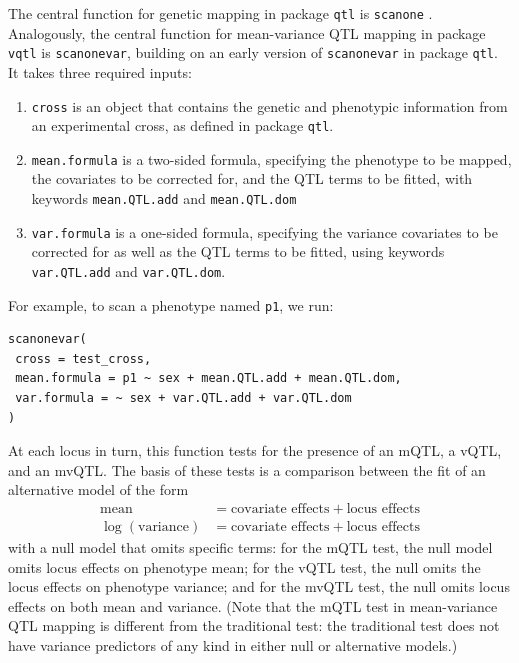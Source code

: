 \documentclass[9pt,twocolumn,twoside]{gsag3jnl}
\begin{document}
The central function for genetic mapping in package \texttt{qtl} is \texttt{scanone} \citep{Broman2003}.
Analogously, the central function for mean-variance QTL mapping in package \texttt{vqtl} is \texttt{scanonevar}, building on an early version of \texttt{scanonevar} in package \texttt{qtl}.
It takes three required inputs:
\begin{enumerate}
    \item \texttt{cross} is an object that contains the genetic and phenotypic information from an experimental cross, as defined in package \texttt{qtl}.
    \item \texttt{mean.formula} is a two-sided formula, specifying the phenotype to be mapped, the covariates to be corrected for, and the QTL terms to be fitted, with keywords \texttt{mean.QTL.add} and \texttt{mean.QTL.dom}
    \item \texttt{var.formula} is a one-sided formula, specifying the variance covariates to be corrected for as well as the QTL terms to be fitted, using keywords \texttt{var.QTL.add} and \texttt{var.QTL.dom}.
\end{enumerate}
For example, to scan a phenotype named \texttt{p1}, we run:
\begin{verbatim}
scanonevar(
 cross = test_cross,
 mean.formula = p1 ~ sex + mean.QTL.add + mean.QTL.dom,
 var.formula = ~ sex + var.QTL.add + var.QTL.dom
)
\end{verbatim}
At each locus in turn, this function tests for the presence of an mQTL, a vQTL, and an mvQTL. The basis of these tests is a comparison between the fit of an alternative model of the form
\begin{align*}
    \text{mean} &= \text{covariate effects} + \text{locus effects}\\
    \log(\text{variance}) &= \text{covariate effects} + \text{locus effects}    
\end{align*}
with a null model that omits specific terms: for the mQTL test, the null model omits locus effects on phenotype mean; for the vQTL test, the null omits the locus effects on phenotype variance; and for the mvQTL test, the null omits locus effects on both mean and variance.
(Note that the mQTL test in mean-variance QTL mapping is different from the traditional test: the traditional test does not have variance predictors of any kind in either null or alternative models.)
\end{document}
